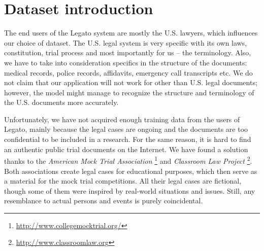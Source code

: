 \documentclass[
  digital, %
  notable,   %
  nolof,     %
  nolot,     %
]{fithesis3}
\begin{document}
\section{Dataset introduction}
The end users of the Legato system are mostly the U.S. lawyers, which influences our choice of dataset.
The U.S. legal system is very specific with its own laws, constitution, trial process and most importantly for us -- the terminology.
Also, we have to take into consideration specifics in the structure of the documents: medical records, police records, affidavits, emergency call transcripts etc.
We do not claim that our application will not work for other than U.S. legal documents; however, the model might manage to recognize the structure and terminology of the U.S. documents more accurately.

Unfortunately, we have not acquired enough training data from the users of Legato, mainly because the legal cases are ongoing and the documents are too confidential to be included in a research.
For the same reason, it is hard to find an authentic public trial documents on the Internet.
We have found a solution thanks to the \textit{American Mock Trial Association} \footnote{\url{http://www.collegemocktrial.org/}} and \textit{Classroom Law Project} \footnote{\url{http://www.classroomlaw.org}}.
Both associations create legal cases for educational purposes, which then serve as a material for the mock trial competitions.
All their legal cases are fictional, though some of them were inspired by real-world situations and issues.
Still, any resemblance to actual persons and events is purely coincidental.
\end{document}
